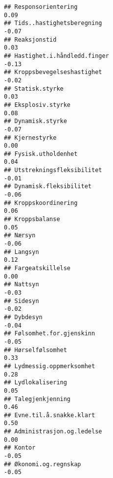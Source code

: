 \documentclass[
]{article}
\begin{document}
\begin{verbatim}
## Responsorientering                                                                0.09
## Tids..hastighetsberegning                                                        -0.07
## Reaksjonstid                                                                      0.03
## Hastighet.i.håndledd.finger                                                      -0.13
## Kroppsbevegelseshastighet                                                        -0.02
## Statisk.styrke                                                                    0.03
## Eksplosiv.styrke                                                                  0.08
## Dynamisk.styrke                                                                  -0.07
## Kjernestyrke                                                                      0.00
## Fysisk.utholdenhet                                                                0.04
## Utstrekningsfleksibilitet                                                        -0.01
## Dynamisk.fleksibilitet                                                           -0.06
## Kroppskoordinering                                                                0.06
## Kroppsbalanse                                                                     0.05
## Nærsyn                                                                           -0.06
## Langsyn                                                                           0.12
## Fargeatskillelse                                                                  0.00
## Nattsyn                                                                          -0.03
## Sidesyn                                                                          -0.02
## Dybdesyn                                                                         -0.04
## Følsomhet.for.gjenskinn                                                          -0.05
## Hørselfølsomhet                                                                   0.33
## Lydmessig.oppmerksomhet                                                           0.28
## Lydlokalisering                                                                   0.05
## Talegjenkjenning                                                                  0.46
## Evne.til.å.snakke.klart                                                           0.50
## Administrasjon.og.ledelse                                                         0.00
## Kontor                                                                           -0.05
## Økonomi.og.regnskap                                                              -0.05

\end{verbatim}
\end{document}
